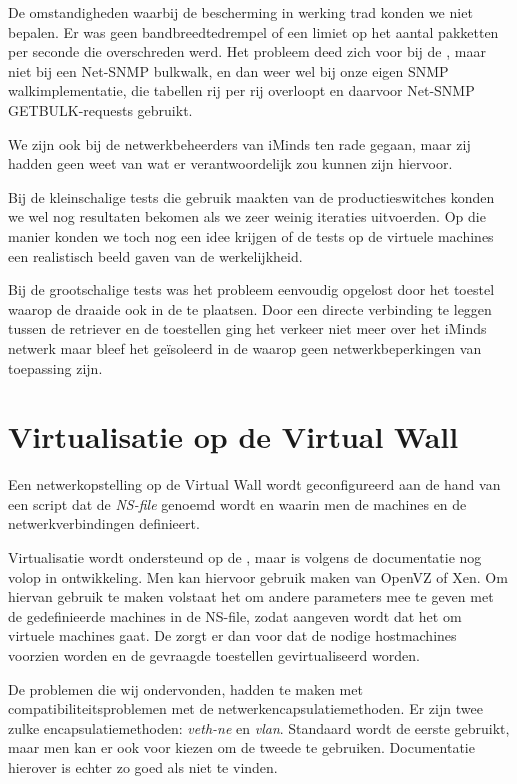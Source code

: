De omstandigheden waarbij de bescherming in werking trad konden we niet bepalen.
Er was geen bandbreedtedrempel of een limiet op het aantal pakketten per seconde die overschreden werd.
Het probleem deed zich voor bij de \nwmretriever{}, maar niet bij een Net-SNMP bulkwalk,
en dan weer wel bij onze eigen SNMP walkimplementatie, die tabellen rij per rij overloopt en daarvoor Net-SNMP GETBULK-requests gebruikt.

We zijn ook bij de netwerkbeheerders van iMinds ten rade gegaan, maar zij hadden geen weet van wat er verantwoordelijk zou kunnen zijn hiervoor.

Bij de kleinschalige tests die gebruik maakten van de productieswitches konden we wel nog resultaten bekomen als we zeer weinig iteraties uitvoerden.
Op die manier konden we toch nog een idee krijgen of de tests op de virtuele machines een realistisch beeld gaven van de werkelijkheid.

Bij de grootschalige tests was het probleem eenvoudig opgelost door het toestel waarop de \nwmretriever{} draaide ook in de \vwall{} te plaatsen.
Door een directe verbinding te leggen tussen de retriever en de toestellen ging het verkeer niet meer over het iMinds netwerk maar bleef het geïsoleerd in de \vwall{} waarop geen netwerkbeperkingen van toepassing zijn.


\section{Virtualisatie op de Virtual Wall}
\label{probleem-virtualisatie-vwall}

Een netwerkopstelling op de Virtual Wall wordt geconfigureerd aan de hand van een script dat de \textit{NS-file} genoemd wordt en
waarin men de machines en de netwerkverbindingen definieert.

Virtualisatie wordt ondersteund op de \vwall{}, maar is volgens de documentatie nog volop in ontwikkeling.
Men kan hiervoor gebruik maken van OpenVZ of Xen\cite{vwall-openvz, vwall-xen}.
Om hiervan gebruik te maken volstaat het om andere parameters mee te geven met de gedefinieerde machines in de NS-file,
zodat aangeven wordt dat het om virtuele machines gaat.
De \vwall{} zorgt er dan voor dat de nodige hostmachines voorzien worden en de gevraagde toestellen gevirtualiseerd worden.

De problemen die wij ondervonden, hadden te maken met compatibiliteitsproblemen met de netwerkencapsulatiemethoden.
Er zijn twee zulke encapsulatiemethoden: \textit{veth-ne} en \textit{vlan}.
Standaard wordt de eerste gebruikt, maar men kan er ook voor kiezen om de tweede te gebruiken.
Documentatie hierover is echter zo goed als niet te vinden.

